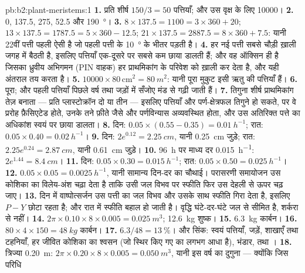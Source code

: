 \begin{solution}{pb:b2:plant-meristems:1}
\textbf{1.} प्रति शीर्ष $150/3 = 50$ पत्तियाँ; और उस वृक्ष के लिए \num{10000}।
\textbf{2.} 0, 137.5, 275, 52.5 और \qty{190}{\degree}।
\textbf{3.} $8\times 137.5 = 1100 = 3\times 360 + 20$; $13\times 137.5
= 1787.5 = 5\times 360 - 12.5$; $21\times 137.5 = 2887.5 = 8\times 360
+ 7.5$: यानी 22वीं पत्ती पहली ऐसी है जो पहली पत्ती के
\qty{10}{\degree} के भीतर पड़ती है।
\textbf{4.} हर नई पत्ती सबसे चौड़ी ख़ाली जगह में बैठती है, इसलिए पत्तियाँ
एक-दूसरे पर सबसे कम छाया डालती हैं; और वह ऑक्सिन ही है जिसका ध्रुवीय
अभिगमन (PIN वाहक) हर प्राथमिकांग के परिवेश को ख़ाली कर देता है, और
यही अंतराल तय करता है।
\textbf{5.} $\num{10000}\times 80\,\text{cm}^{2} = \qty{80}{m^2}$: यानी
पूरा मुकुट इसी ऋतु की पत्तियाँ हैं।
\textbf{6.} पूरा; और पहली पत्तियाँ पिछले वर्ष  तथा जड़ों में सँजोए
मंड से गढ़ी जाती हैं।
\textbf{7.} तिगुना शीर्ष प्राथमिकांग तेज़ बनाता --- प्रति
प्लास्टोक्रॉन दो या तीन --- इसलिए पत्तियाँ और पर्ण-क्षेत्रफल तिगुने हो
सकते, पर वे प्ररोह फ़ैसिएटेड होते, उनके तने फ़ीते जैसे और पर्णविन्यास
अव्यवस्थित होता, और उस अतिरिक्त पत्ते का अधिकांश स्वयं पर छाया डालता।
\textbf{8.} दिन: $0.05\times(0.55 - 0.35) = \qty{0.01}{h^{-1}}$; रात:
$0.05\times 0.40 = \qty{0.02}{h^{-1}}$।
\textbf{9.} दिन: $2e^{0.12} = \qty{2.25}{cm}$, यानी \qty{0.25}{cm} जुड़े;
रात: $2.25e^{0.24} = \qty{2.87}{cm}$, यानी \qty{0.61}{cm} जुड़े।
\textbf{10.} \qty{96}{h} पर माध्य दर \qty{0.015}{h^{-1}}: $2e^{1.44}
= \qty{8.4}{cm}$।
\textbf{11.} दिन: $0.05\times 0.30 = \qty{0.015}{h^{-1}}$; रात:
$0.05\times 0.50 = \qty{0.025}{h^{-1}}$।
\textbf{12.} $0.05\times 0.05 = \qty{0.0025}{h^{-1}}$, यानी सामान्य
दिन-दर का चौथाई। परासरणी समायोजन उस कोशिका का विलेय-अंश चढ़ा देता है
ताकि उसी जल विभव पर स्फीति फिर उस देहली से ऊपर चढ़ जाए।
\textbf{13.} दिन में वाष्पोत्सर्जन उस पत्ती का जल विभव और उसके साथ
स्फीति गिरा देता है, इसलिए $P - Y$ छोटा रहता है; और रात में स्फीति
बहाल हो जाती है। वृद्धि घंटे-दर-घंटे जल से सीमित है, शर्करा से नहीं।
\textbf{14.} $2\pi\times 0.10\times 8\times 0.005 = \qty{0.025}{m^3}$;
\qty{12.6}{kg} शुष्क।
\textbf{15.} \qty{6.3}{kg} कार्बन।
\textbf{16.} $80\times 4\times 150 = \qty{48}{kg}$ कार्बन।
\textbf{17.} $6.3/48 = \qty{13}{\%}$। और सिंक: स्वयं पत्तियाँ,
जड़ें, शाखाएँ तथा टहनियाँ, हर जीवित कोशिका का श्वसन (जो स्थिर किए गए का
लगभग आधा है), भंडार,  तथा
।
\textbf{18.} त्रिज्या \qty{0.20}{m}: $2\pi\times 0.20\times 8\times
0.005 = \qty{0.050}{m^3}$, यानी इस वर्ष का दुगुना --- क्योंकि जिस परिधि

\end{solution}
